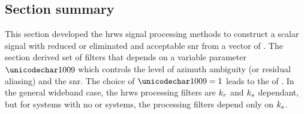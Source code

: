 \subsection{Section summary}
This section developed the \gls{hrws} signal processing methods to construct a scalar signal with reduced or eliminated  and acceptable \gls{snr} from a vector of . The section derived set of filters that depends on a variable parameter $\cost$ which controls the level of azimuth ambiguity (or residual aliasing) and the \gls{snr}. The choice of $\cost=1$ leads to the  of \cite{Krieger2004,Gebert2009b,GebertPHD}. In the general \gls{wideband} case, the \gls{hrws} processing filters are $k_r$ and $k_{s}$ dependant, but for systems with no  or  systems, the processing filters depend only on $k_{s}$.


